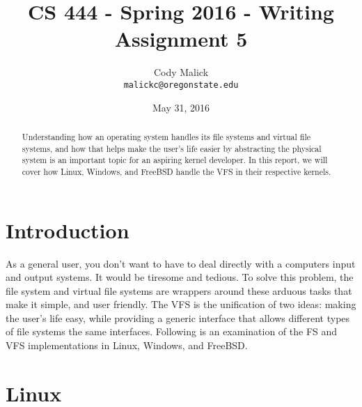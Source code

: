 
%
% 
\begin{titlepage}
  \title{CS 444 - Spring 2016 - Writing Assignment 5}
  \author{Cody Malick\\
  \texttt{malickc@oregonstate.edu}}
  \date{May 31, 2016}
  \maketitle
  \vspace*{4cm}
  \begin{abstract}
      \noindent Understanding how an operating system handles its file systems and
      virtual file systems, and how that helps make the user's life easier by abstracting
      the physical system is an important topic for an aspiring kernel developer.
      In this report, we will cover how Linux, Windows, and FreeBSD handle the
      VFS in their respective kernels.
  \end{abstract}
\end{titlepage}

\tableofcontents
\clearpage
\section{Introduction}
As a general user, you don't want to have to deal directly with a computers
input and output systems. It would be tiresome and tedious. To solve this
problem, the file system and virtual file systems are wrappers around these
arduous tasks that make it simple, and user friendly. The VFS is the unification
of two ideas: making the user's life easy, while providing a generic interface
that allows different types of file systems the same interfaces. Following is
an examination of the FS and VFS implementations in Linux, Windows, and FreeBSD.
\section{Linux}
